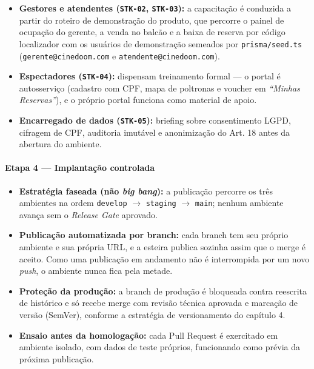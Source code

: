 \begin{itemize}
\item \textbf{Gestores e atendentes (\texttt{STK-02}, \texttt{STK-03}):} a capacitação é conduzida a partir do roteiro de demonstração do produto, que percorre o painel de ocupação do gerente, a venda no balcão e a baixa de reserva por código localizador com os usuários de demonstração semeados por \texttt{prisma/\allowbreak\hspace{0pt plus 1pt}seed.\allowbreak\hspace{0pt plus 1pt}ts} (\texttt{gerente@cinedoom.\allowbreak\hspace{0pt plus 1pt}com} e \texttt{atendente@cinedoom.\allowbreak\hspace{0pt plus 1pt}com}).
\item \textbf{Espectadores (\texttt{STK-04}):} dispensam treinamento formal — o portal é autosserviço (cadastro com CPF, mapa de poltronas e voucher em \emph{``Minhas Reservas''}), e o próprio portal funciona como material de apoio.
\item \textbf{Encarregado de dados (\texttt{STK-05}):} briefing sobre consentimento LGPD, cifragem de CPF, auditoria imutável e anonimização do Art. 18 antes da abertura do ambiente.
\end{itemize}

\paragraph{Etapa 4 — Implantação controlada}

\begin{itemize}
\item \textbf{Estratégia faseada (não \emph{big bang}):} a publicação percorre os três ambientes na ordem \texttt{develop} $\to$ \texttt{staging} $\to$ \texttt{main}; nenhum ambiente avança sem o \emph{Release Gate} aprovado.
\item \textbf{Publicação automatizada por branch:} cada branch tem seu próprio ambiente e sua própria URL, e a esteira publica sozinha assim que o merge é aceito. Como uma publicação em andamento não é interrompida por um novo \emph{push}, o ambiente nunca fica pela metade.
\item \textbf{Proteção da produção:} a branch de produção é bloqueada contra reescrita de histórico e só recebe merge com revisão técnica aprovada e marcação de versão (SemVer), conforme a estratégia de versionamento do capítulo 4.
\item \textbf{Ensaio antes da homologação:} cada Pull Request é exercitado em ambiente isolado, com dados de teste próprios, funcionando como prévia da próxima publicação.
\end{itemize}

